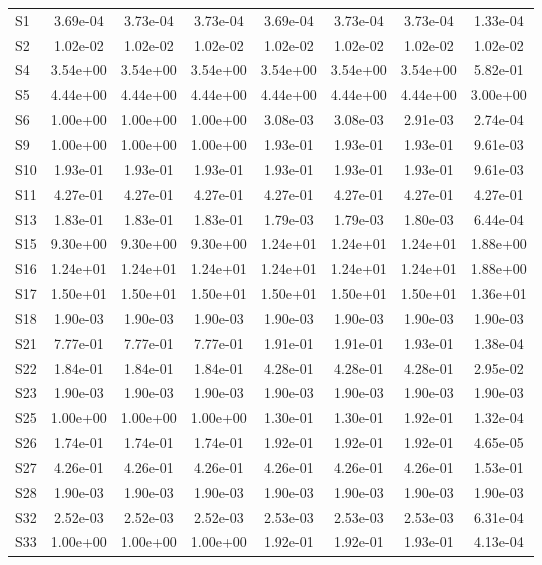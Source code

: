 {\begin{longtable}{l S[table-format=1.2e+2] S[table-format=1.2e+2] S[table-format=1.2e+2] S[table-format=1.2e+2] S[table-format=1.2e+2] S[table-format=1.2e+2] S[table-format=1.2e+2]}
S1 & 3.69e-04 & 3.73e-04 & 3.73e-04 & 3.69e-04 & 3.73e-04 & 3.73e-04 & 1.33e-04 \\
S2 & 1.02e-02 & 1.02e-02 & 1.02e-02 & 1.02e-02 & 1.02e-02 & 1.02e-02 & 1.02e-02 \\
S4 & 3.54e+00 & 3.54e+00 & 3.54e+00 & 3.54e+00 & 3.54e+00 & 3.54e+00 & 5.82e-01 \\
S5 & 4.44e+00 & 4.44e+00 & 4.44e+00 & 4.44e+00 & 4.44e+00 & 4.44e+00 & 3.00e+00 \\
S6 & 1.00e+00 & 1.00e+00 & 1.00e+00 & 3.08e-03 & 3.08e-03 & 2.91e-03 & 2.74e-04 \\
S9 & 1.00e+00 & 1.00e+00 & 1.00e+00 & 1.93e-01 & 1.93e-01 & 1.93e-01 & 9.61e-03 \\
S10 & 1.93e-01 & 1.93e-01 & 1.93e-01 & 1.93e-01 & 1.93e-01 & 1.93e-01 & 9.61e-03 \\
S11 & 4.27e-01 & 4.27e-01 & 4.27e-01 & 4.27e-01 & 4.27e-01 & 4.27e-01 & 4.27e-01 \\
S13 & 1.83e-01 & 1.83e-01 & 1.83e-01 & 1.79e-03 & 1.79e-03 & 1.80e-03 & 6.44e-04 \\
S15 & 9.30e+00 & 9.30e+00 & 9.30e+00 & 1.24e+01 & 1.24e+01 & 1.24e+01 & 1.88e+00 \\
S16 & 1.24e+01 & 1.24e+01 & 1.24e+01 & 1.24e+01 & 1.24e+01 & 1.24e+01 & 1.88e+00 \\
S17 & 1.50e+01 & 1.50e+01 & 1.50e+01 & 1.50e+01 & 1.50e+01 & 1.50e+01 & 1.36e+01 \\
S18 & 1.90e-03 & 1.90e-03 & 1.90e-03 & 1.90e-03 & 1.90e-03 & 1.90e-03 & 1.90e-03 \\
S21 & 7.77e-01 & 7.77e-01 & 7.77e-01 & 1.91e-01 & 1.91e-01 & 1.93e-01 & 1.38e-04 \\
S22 & 1.84e-01 & 1.84e-01 & 1.84e-01 & 4.28e-01 & 4.28e-01 & 4.28e-01 & 2.95e-02 \\
S23 & 1.90e-03 & 1.90e-03 & 1.90e-03 & 1.90e-03 & 1.90e-03 & 1.90e-03 & 1.90e-03 \\
S25 & 1.00e+00 & 1.00e+00 & 1.00e+00 & 1.30e-01 & 1.30e-01 & 1.92e-01 & 1.32e-04 \\
S26 & 1.74e-01 & 1.74e-01 & 1.74e-01 & 1.92e-01 & 1.92e-01 & 1.92e-01 & 4.65e-05 \\
S27 & 4.26e-01 & 4.26e-01 & 4.26e-01 & 4.26e-01 & 4.26e-01 & 4.26e-01 & 1.53e-01 \\
S28 & 1.90e-03 & 1.90e-03 & 1.90e-03 & 1.90e-03 & 1.90e-03 & 1.90e-03 & 1.90e-03 \\
S32 & 2.52e-03 & 2.52e-03 & 2.52e-03 & 2.53e-03 & 2.53e-03 & 2.53e-03 & 6.31e-04 \\
S33 & 1.00e+00 & 1.00e+00 & 1.00e+00 & 1.92e-01 & 1.92e-01 & 1.93e-01 & 4.13e-04 \\

\end{longtable}}
